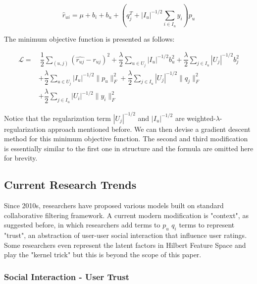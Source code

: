 \documentclass[letter paper, 11pt]{article}
\begin{document}
	\begin{equation}
		\hat{r}_{ui} = \mu + b_i + b_u  + (q_j^T + |I_u|^{-1/2}\sum_{i \in I_u} y_i) p_u
	\end{equation}
	
	The minimum objective function is presented as follows:
	
	\begin{equation}
		\tag*{First Modification of Extended SVD++}
		\begin{split}
			\mathcal{L} = &\ \dfrac{1}{2} \sum_{(u, j)} (\hat{r_{uj}} - r_{uj})^2 + \dfrac{\lambda}{2} \sum_{u \in U_j} |I_u|^{-1/2} b_u^2 + \dfrac{\lambda}{2} \sum_{j \in I_u} |U_j|^{-1/2} b_j^2 \\
			& + \dfrac{\lambda}{2} \sum_{u \in U_j} |I_u|^{-1/2} \|p_u\|_F^{2} + \dfrac{\lambda}{2} \sum_{j \in I_u} |U_j|^{-1/2} \|q_j\|_F^{2} \\
			& + \dfrac{\lambda}{2} \sum_{j \in I_u} |U_i|^{-1/2} \|y_i\|_F^{2}
		\end{split}
	\end{equation}
	
	Notice that the regularization term $|U_j|^{-1/2}$ and $|I_u|^{-1/2}$ are weighted-$\lambda$-regularization approach mentioned before. We can then devise a gradient descent method for this minimum objective function. The second and third modification is essentially similar to the first one in structure and the formula are omitted here for brevity.
	
	
	\subsection{Current Research Trends}
	Since 2010s, researchers have proposed various models built on standard collaborative filtering framework. A current modern modification is "context", as suggested before, in which researchers add terms to $p_u$ $q_i$ terms to represent "trust", an abstraction of user-user social interaction that influence user ratings. Some researchers even represent the latent factors in Hilbert Feature Space and play the "kernel trick" \cite{Kernel-MF} but this is beyond the scope of this paper.
	
	\subsubsection{Social Interaction - User Trust}
	
\end{document}
